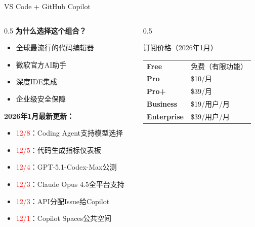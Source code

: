 \documentclass[aspectratio=169,11pt]{beamer}
\begin{document}
\begin{frame}{VS Code + GitHub Copilot}
    \begin{columns}
        \begin{column}{0.5\textwidth}
            \textbf{为什么选择这个组合？}
            \begin{itemize}
                \item 全球最流行的代码编辑器
                \item 微软官方AI助手
                \item 深度IDE集成
                \item 企业级安全保障
            \end{itemize}
            
            \vspace{0.3cm}
            \textbf{2026年1月最新更新：}
            \begin{itemize}
                \item \textcolor{red}{12/8}：Coding Agent支持模型选择
                \item \textcolor{red}{12/5}：代码生成指标仪表板
                \item \textcolor{red}{12/4}：GPT-5.1-Codex-Max公测
                \item \textcolor{red}{12/3}：Claude Opus 4.5全平台支持
                \item \textcolor{red}{12/3}：API分配Issue给Copilot
                \item \textcolor{red}{12/1}：Copilot Spaces公共空间
            \end{itemize}
        \end{column}
        \begin{column}{0.5\textwidth}
            \begin{block}{订阅价格（2026年1月）}
                \begin{tabular}{ll}
                    \textbf{Free} & 免费（有限功能） \\
                    \textbf{Pro} & \$10/月 \\
                    \textbf{Pro+} & \$39/月 \\
                    \textbf{Business} & \$19/用户/月 \\
                    \textbf{Enterprise} & \$39/用户/月 \\
                \end{tabular}
            \end{block}
            

\end{column}
\end{columns}
\end{frame}
\end{document}
